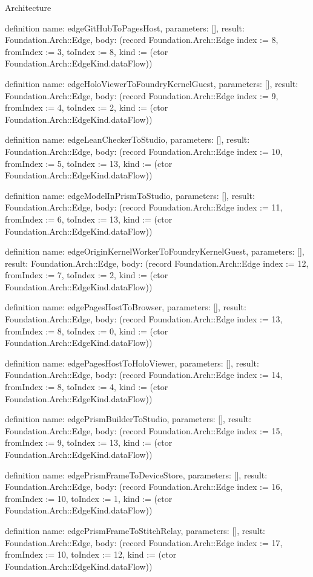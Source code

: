 \begin{lexlean}{Architecture}
\begin{semanticmodule}
definition{
  name: edgeGitHubToPagesHost,
  parameters: [],
  result: Foundation.Arch::Edge,
  body: (record Foundation.Arch::Edge {index := 8, fromIndex := 3, toIndex := 8, kind := (ctor Foundation.Arch::EdgeKind.dataFlow)})
}

definition{
  name: edgeHoloViewerToFoundryKernelGuest,
  parameters: [],
  result: Foundation.Arch::Edge,
  body: (record Foundation.Arch::Edge {index := 9, fromIndex := 4, toIndex := 2, kind := (ctor Foundation.Arch::EdgeKind.dataFlow)})
}

definition{
  name: edgeLeanCheckerToStudio,
  parameters: [],
  result: Foundation.Arch::Edge,
  body: (record Foundation.Arch::Edge {index := 10, fromIndex := 5, toIndex := 13, kind := (ctor Foundation.Arch::EdgeKind.dataFlow)})
}

definition{
  name: edgeModelInPrismToStudio,
  parameters: [],
  result: Foundation.Arch::Edge,
  body: (record Foundation.Arch::Edge {index := 11, fromIndex := 6, toIndex := 13, kind := (ctor Foundation.Arch::EdgeKind.dataFlow)})
}

definition{
  name: edgeOriginKernelWorkerToFoundryKernelGuest,
  parameters: [],
  result: Foundation.Arch::Edge,
  body: (record Foundation.Arch::Edge {index := 12, fromIndex := 7, toIndex := 2, kind := (ctor Foundation.Arch::EdgeKind.dataFlow)})
}

definition{
  name: edgePagesHostToBrowser,
  parameters: [],
  result: Foundation.Arch::Edge,
  body: (record Foundation.Arch::Edge {index := 13, fromIndex := 8, toIndex := 0, kind := (ctor Foundation.Arch::EdgeKind.dataFlow)})
}

definition{
  name: edgePagesHostToHoloViewer,
  parameters: [],
  result: Foundation.Arch::Edge,
  body: (record Foundation.Arch::Edge {index := 14, fromIndex := 8, toIndex := 4, kind := (ctor Foundation.Arch::EdgeKind.dataFlow)})
}

definition{
  name: edgePrismBuilderToStudio,
  parameters: [],
  result: Foundation.Arch::Edge,
  body: (record Foundation.Arch::Edge {index := 15, fromIndex := 9, toIndex := 13, kind := (ctor Foundation.Arch::EdgeKind.dataFlow)})
}

definition{
  name: edgePrismFrameToDeviceStore,
  parameters: [],
  result: Foundation.Arch::Edge,
  body: (record Foundation.Arch::Edge {index := 16, fromIndex := 10, toIndex := 1, kind := (ctor Foundation.Arch::EdgeKind.dataFlow)})
}

definition{
  name: edgePrismFrameToStitchRelay,
  parameters: [],
  result: Foundation.Arch::Edge,
  body: (record Foundation.Arch::Edge {index := 17, fromIndex := 10, toIndex := 12, kind := (ctor Foundation.Arch::EdgeKind.dataFlow)})
}


\end{semanticmodule}
\end{lexlean}

